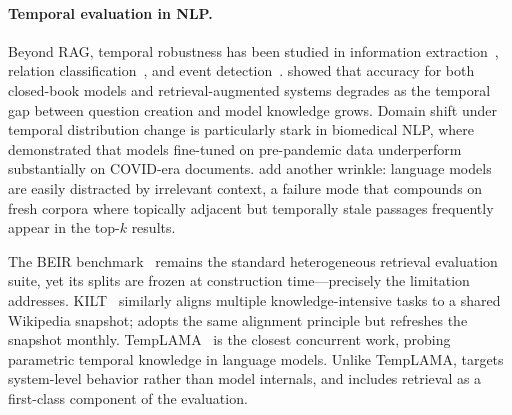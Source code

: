 \paragraph{Temporal evaluation in NLP.}
Beyond RAG, temporal robustness has been studied in information extraction~\citep{loureiro2022timelms}, relation classification~\citep{dhingra2022time}, and event detection~\citep{cohen2021temporal}. \citet{chen2022temporalqa} showed that accuracy for both closed-book models and retrieval-augmented systems degrades as the temporal gap between question creation and model knowledge grows. Domain shift under temporal distribution change is particularly stark in biomedical NLP, where \citet{muller2022covid} demonstrated that models fine-tuned on pre-pandemic data underperform substantially on COVID-era documents. \citet{shi2024ircot} add another wrinkle: language models are easily distracted by irrelevant context, a failure mode that compounds on fresh corpora where topically adjacent but temporally stale passages frequently appear in the top-$k$ results.

The BEIR benchmark~\citep{thakur2021beir} remains the standard heterogeneous retrieval evaluation suite, yet its splits are frozen at construction time---precisely the limitation \method{} addresses. KILT~\citep{petroni2021kilt} similarly aligns multiple knowledge-intensive tasks to a shared Wikipedia snapshot; \method{} adopts the same alignment principle but refreshes the snapshot monthly. TempLAMA~\citep{dhingra2022time} is the closest concurrent work, probing parametric temporal knowledge in language models. Unlike TempLAMA, \method{} targets system-level behavior rather than model internals, and includes retrieval as a first-class component of the evaluation.
